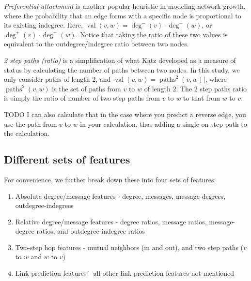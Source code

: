 \documentclass[conference]{IEEEtran}
\begin{document}
\emph{Preferential attachment} is another popular heuristic in modeling network growth, where the probability that an edge forms with a specific node is proportional to its existing indegree. Here, $\operatorname{val}(v,w) = \deg^-(v)\cdot \deg^+(w)$, or $\deg^+(v)\cdot \deg^-(w)$. Notice that taking the ratio of these two values is equivalent to the outdegree/indegree ratio between two nodes.

\emph{2 step paths (ratio)} is a simplification of what Katz \cite{Katz:1953un} developed as a measure of status by calculating the number of paths between two nodes. In this study, we only consider paths of length 2, and $\operatorname{val}(v,w) = \operatorname{paths}^2(v,w)|$, where $\operatorname{paths}^2(v,w)$ is the set of paths from $v$ to $w$ of length $2$. The 2 step paths ratio is simply the ratio of number of two step paths from $v$ to $w$ to that from $w$ to $v$. 

TODO I can also calculate that in the case where you predict a reverse edge, you use the path from $v$ to $w$ in your calculation, thus adding a single on-step path to the calculation.

\subsection{Different sets of features}
For convenience, we further break down these into four sets of features:
\begin{enumerate}
	\item Absolute degree/message features - degree, messages, message-degrees, outdegree-indegrees
	\item Relative degree/message features - degree ratios, message ratios, message-degree ratios, and outdegree-indegree ratios
	\item Two-step hop features - mutual neighbors (in and out), and two step paths ($v$ to $w$ and $w$ to $v$)
	\item Link prediction features - all other link prediction features not mentioned
\end{enumerate}
\end{document}
